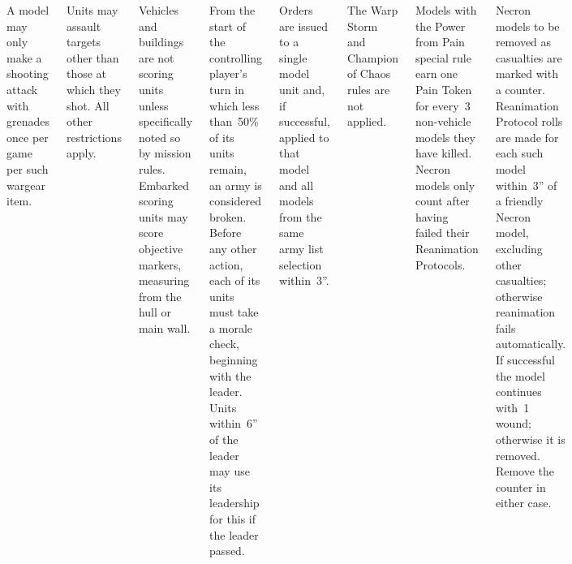 \begin{columns}
 A model may only make a shooting attack
with grenades once per game per such wargear item.



  Units may assault targets other than
those at which they shot.  All other restrictions apply.


%

\vspace{-9pt}%
 Vehicles and buildings are
not scoring units unless specifically noted so by mission rules.
Embarked scoring units may score objective markers, measuring from the
hull or main wall.

  From the start of the controlling
player's turn in which less than~50\% of its units remain, an army is
considered broken.  Before any other action, each of its units must
take a morale check, beginning with the leader.  Units within~6'' of
the leader may use its leadership for this if the leader passed.

%

\vspace{-9pt}%
 Orders are issued to a single
model unit and, if successful, applied to that model and all models
from the same army list selection within~3''.

\vspace{-9pt}%
 The Warp Storm
and Champion of Chaos rules are not applied.



\vspace{-9pt}%
 Models with the Power from Pain
special rule earn one Pain Token for every~3 non-vehicle models they
have killed. Necron models only count after having failed their
Reanimation Protocols.

\vspace{-9pt}%
 Necron models to be removed as casualties
are marked with a counter.  Reanimation Protocol rolls are made for
each such model within~3'' of a friendly Necron model, excluding other
casualties; otherwise reanimation fails automatically.  If successful
the model continues with~1 wound; otherwise it is removed.  Remove the
counter in either case.

\end{columns}

